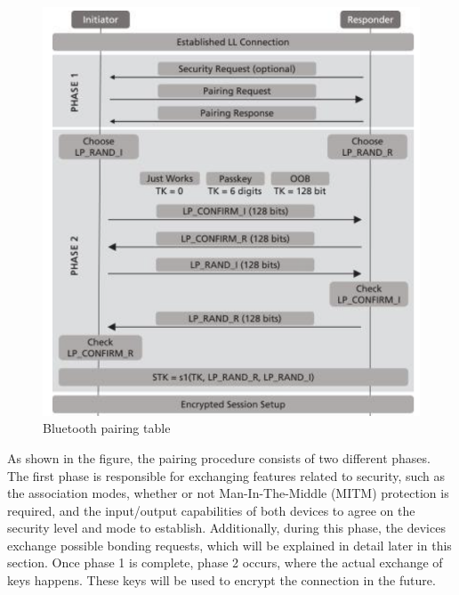 \documentclass{Configuration_Files/PoliMi3i_thesis}
\begin{document}
\begin{figure}[H]
    \centering
    \includegraphics[scale=0.7]{Bluetooth_Security/2.png}
    \caption{Bluetooth pairing table}
    \label{bluetooth_sec_2}
\end{figure}

As shown in the figure, the pairing procedure consists of two different phases. The first phase is responsible for exchanging features related to security, such as the association modes, whether or not Man-In-The-Middle (MITM) protection is required, and the input/output capabilities of both devices to agree on the security level and mode to establish. Additionally, during this phase, the devices exchange possible bonding requests, which will be explained in detail later in this section. Once phase 1 is complete, phase 2 occurs, where the actual exchange of keys happens. These keys will be used to encrypt the connection in the future.
\end{document}
